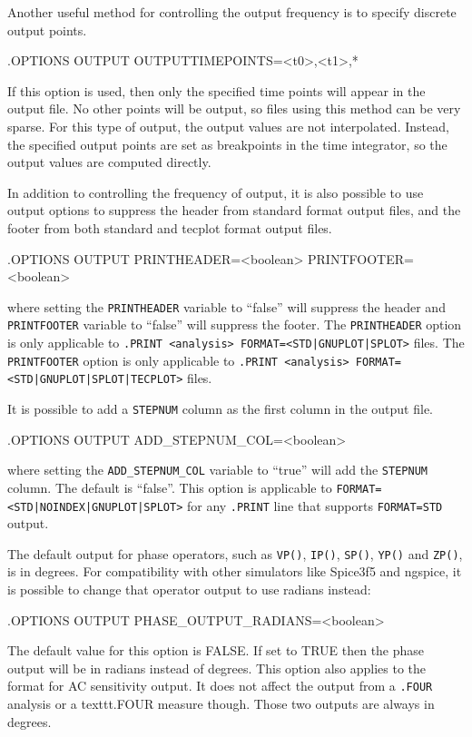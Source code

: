 Another useful method for controlling the output frequency is to specify discrete output
points.  
\begin{vquote}
.OPTIONS OUTPUT OUTPUTTIMEPOINTS=<t0>,<t1>,* 
\end{vquote}
If this option is used, then only the specified time points will appear in the output file.
No other points will be output, so files using this method can be very sparse.  For this type
of output, the output values are not interpolated.  Instead, the specified output points are 
set as breakpoints in the time integrator, so the output values are computed directly.

In addition to controlling the frequency of output, it is also possible to use
output options to suppress the header from standard format output files, and the footer
from both standard and tecplot format output files.
\begin{vquote}
.OPTIONS OUTPUT PRINTHEADER=<boolean> PRINTFOOTER=<boolean>
\end{vquote}
where setting the \texttt{PRINTHEADER} variable to ``false'' will suppress the header and 
\texttt{PRINTFOOTER} variable to ``false'' will suppress the footer.  The \texttt{PRINTHEADER}
option is only applicable to \texttt{.PRINT <analysis> FORMAT=<STD|GNUPLOT|SPLOT>} files.
The \texttt{PRINTFOOTER} option is only applicable to
\texttt{.PRINT <analysis> FORMAT=<STD|GNUPLOT|SPLOT|TECPLOT>} files.

It is possible to add a \texttt{STEPNUM} column as the first column in the output file.
\begin{vquote}
.OPTIONS OUTPUT ADD\_STEPNUM\_COL=<boolean>
\end{vquote}
where setting the \texttt{ADD\_STEPNUM\_COL} variable to ``true'' will add the
\texttt{STEPNUM} column.  The default is ``false''. This option is applicable to
\texttt{FORMAT=<STD|NOINDEX|GNUPLOT|SPLOT>} for any \texttt{.PRINT} line that
supports \texttt{FORMAT=STD} output.

The default \Xyce{} output for phase operators, such as \texttt{VP()}, \texttt{IP()},
\texttt{SP()}, \texttt{YP()} and \texttt{ZP()}, is in degrees.  For compatibility with
other simulators like Spice3f5 and ngspice, it is possible to change that operator
output to use radians instead:
\begin{vquote}
.OPTIONS OUTPUT PHASE\_OUTPUT\_RADIANS=<boolean>
\end{vquote}
The default value for this option is FALSE.  If set to TRUE then the phase output
will be in radians instead of degrees.  This option also applies to the format
for AC sensitivity output.  It does not affect the output from a \texttt{.FOUR}
analysis or a texttt{.FOUR} measure though.  Those two outputs are always in degrees.

